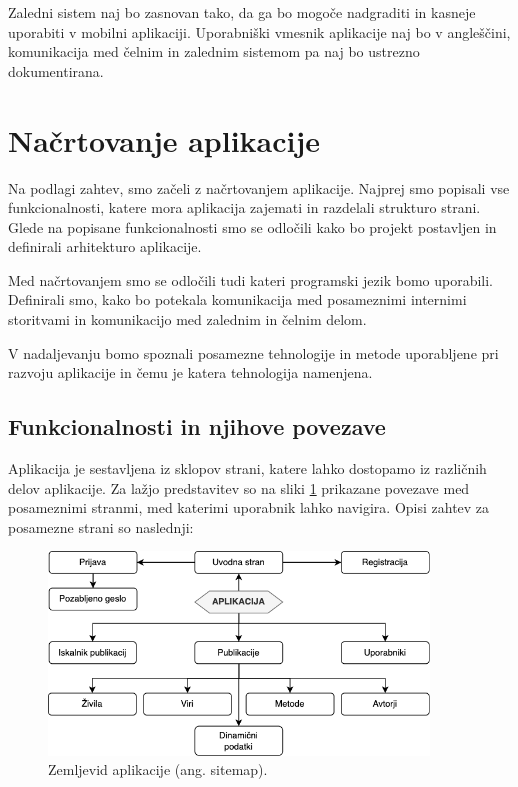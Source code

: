 \documentclass[a4paper, 12pt]{book}
\begin{document}
Zaledni sistem naj bo zasnovan tako, da ga bo mogoče nadgraditi in kasneje uporabiti v mobilni aplikaciji. Uporabniški vmesnik aplikacije naj bo v angleščini, komunikacija med čelnim in zalednim sistemom pa naj bo ustrezno dokumentirana.



\section{Načrtovanje aplikacije}
\label{nacrtovanje}
Na podlagi zahtev, smo začeli z načrtovanjem aplikacije. Najprej smo popisali vse funkcionalnosti, katere mora aplikacija zajemati in razdelali strukturo strani. Glede na popisane funkcionalnosti smo se odločili kako bo projekt postavljen in definirali arhitekturo aplikacije. 

Med načrtovanjem smo se odločili tudi kateri programski jezik bomo uporabili. Definirali smo, kako bo potekala komunikacija med posameznimi internimi storitvami in komunikacijo med zalednim in čelnim delom. 

V nadaljevanju bomo spoznali posamezne tehnologije in metode uporabljene pri razvoju aplikacije in čemu je katera tehnologija namenjena. 

\subsection{Funkcionalnosti in njihove povezave}
Aplikacija je sestavljena iz sklopov strani, katere lahko dostopamo iz različnih delov aplikacije. Za lažjo predstavitev so na sliki \ref{sitemap} prikazane povezave med posameznimi stranmi, med katerimi uporabnik lahko navigira. Opisi zahtev za posamezne strani so naslednji:


\begin{figure}[h]
\begin{center}
\includegraphics[width=0.9\textwidth]{slike/page-map.png}
\end{center}
\caption{ Zemljevid aplikacije (ang. sitemap). }
\label{sitemap}
\end{figure}
\end{document}
